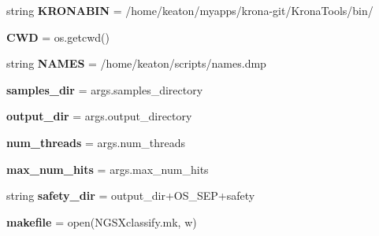 \begin{DoxyCompactItemize}
\item 
string {\bfseries K\+R\+O\+N\+A\+B\+IN} = \textquotesingle{}/home/keaton/myapps/krona-\/git/Krona\+Tools/bin/\textquotesingle{}\hypertarget{namespaceNGSXclassify_ae0d34c43ab538896e37ac379d75b2a40}{}\label{namespaceNGSXclassify_ae0d34c43ab538896e37ac379d75b2a40}

\item 
{\bfseries C\+WD} = os.\+getcwd()\hypertarget{namespaceNGSXclassify_ad91ec2a793b6331798b5c7fc0437105a}{}\label{namespaceNGSXclassify_ad91ec2a793b6331798b5c7fc0437105a}

\item 
string {\bfseries N\+A\+M\+ES} = \textquotesingle{}/home/keaton/scripts/names.\+dmp\textquotesingle{}\hypertarget{namespaceNGSXclassify_aec3d7cc4e4bb4cd3829b49d26b9cd743}{}\label{namespaceNGSXclassify_aec3d7cc4e4bb4cd3829b49d26b9cd743}

\item 
{\bfseries samples\+\_\+dir} = args.\+samples\+\_\+directory\hypertarget{namespaceNGSXclassify_a0e68d4d2e0dc4e2ece2fce13fdb4604a}{}\label{namespaceNGSXclassify_a0e68d4d2e0dc4e2ece2fce13fdb4604a}

\item 
{\bfseries output\+\_\+dir} = args.\+output\+\_\+directory\hypertarget{namespaceNGSXclassify_affd890d6931b648e00cedbb850f4f955}{}\label{namespaceNGSXclassify_affd890d6931b648e00cedbb850f4f955}

\item 
{\bfseries num\+\_\+threads} = args.\+num\+\_\+threads\hypertarget{namespaceNGSXclassify_a71d876e280cbefcd81a0fb30913a8c3d}{}\label{namespaceNGSXclassify_a71d876e280cbefcd81a0fb30913a8c3d}

\item 
{\bfseries max\+\_\+num\+\_\+hits} = args.\+max\+\_\+num\+\_\+hits\hypertarget{namespaceNGSXclassify_abe55cc329a83559434ca4027e6704ef5}{}\label{namespaceNGSXclassify_abe55cc329a83559434ca4027e6704ef5}

\item 
string {\bfseries safety\+\_\+dir} = output\+\_\+dir+O\+S\+\_\+\+S\+EP+\textquotesingle{}safety\textquotesingle{}\hypertarget{namespaceNGSXclassify_a8aac21e94be3ee2300e296c454a03ce1}{}\label{namespaceNGSXclassify_a8aac21e94be3ee2300e296c454a03ce1}

\item 
{\bfseries makefile} = open(\textquotesingle{}N\+G\+S\+Xclassify.\+mk\textquotesingle{}, \textquotesingle{}w\textquotesingle{})\hypertarget{namespaceNGSXclassify_aabc1381dc808eb6d1c4f39f2d9ef36e5}{}\label{namespaceNGSXclassify_aabc1381dc808eb6d1c4f39f2d9ef36e5}


\end{DoxyCompactItemize}
